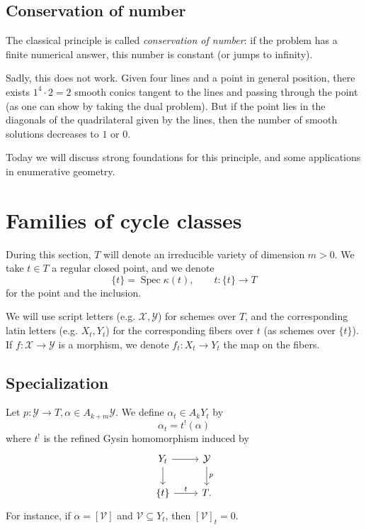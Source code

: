 \documentclass[leqno, openany]{memoir}
\theoremstyle{definition}
\theoremstyle{remark}
\theoremstyle{plain}
\theoremstyle{definition}
\theoremstyle{remark}
\newcommand{\mc}[1]{\mathcal{#1}}
\DeclareMathOperator{\Spec}{Spec}
\begin{document}
\subsection{Conservation of number}%

The classical principle is called \emph{conservation of number}: if the problem
has a finite numerical answer, this number is constant (or jumps to infinity).

Sadly, this does not work. Given four lines and a point in general position,
there exists $1^4 \cdot 2=2$ smooth conics tangent to the lines and passing
through the point (as one can show by taking the dual problem). But if the
point lies in the diagonals of the quadrilateral given by the lines, then the
number of smooth solutions decreases to $1$ or $0$. 

Today we will discuss strong foundations for this principle, and some
applications in enumerative geometry. 

\section{Families of cycle classes}

During this section, $T$ will denote an irreducible variety of dimension $m>0$.
We take $t \in T$ a regular closed point, and we denote \[ \{t\}=\Spec
\kappa(t), \qquad t\colon \{t\} \to T \] for the point and the inclusion.

We will use script letters (e.g. $\mc{X}, \mc{Y}$) for schemes over $T$, and
the corresponding latin letters (e.g. $X_t, Y_t$) for the corresponding fibers
over $t$ (as schemes over $\{t\}$). If $f\colon \mc{X} \to \mc{Y}$ is a
morphism, we denote $f_t\colon X_t \to Y_t$ the map on the fibers.

\subsection{Specialization}%


Let $p\colon \mc{Y} \to T, \alpha \in A_{k+m}\mc{Y}$. We define $\alpha_t \in
A_k Y_t$ by \[ \alpha_t = t^!(\alpha) \] where $t^{!}$ is the refined Gysin
homomorphism induced by \[ \begin{tikzcd} Y_t \arrow[r] \arrow[d] & \mc{Y}
\arrow[d, "p"] \\ {\{t\}} \arrow[r, "t"] & T. \end{tikzcd} \] For instance, if
$\alpha=[\mc{V}]$ and $\mc{V} \subseteq Y_t$, then ${[\mc{V}]}_t=0$. 
\end{document}
